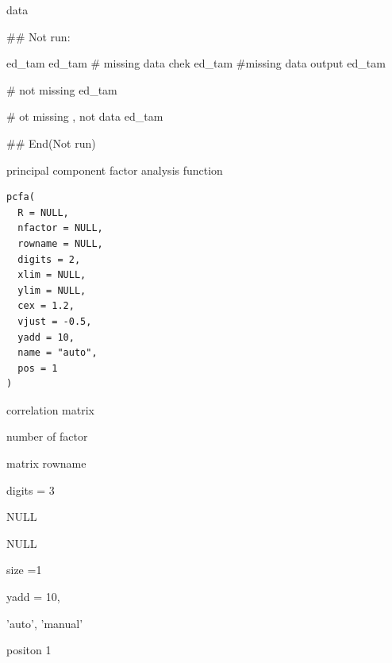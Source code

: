 \documentclass[a4paper]{book}
\begin{document}
%
\begin{Value}
data
\end{Value}
%
\begin{Examples}
\begin{ExampleCode}

## Not run: 

ed_tam %
ed_tam %
# missing data chek
ed_tam %
#missing data output
ed_tam %

# not missing
ed_tam %

# ot missing , not data
ed_tam %



## End(Not run)


\end{ExampleCode}
\end{Examples}
%
\begin{Description}
principal component factor analysis function
\end{Description}
%
\begin{Usage}
\begin{verbatim}
pcfa(
  R = NULL,
  nfactor = NULL,
  rowname = NULL,
  digits = 2,
  xlim = NULL,
  ylim = NULL,
  cex = 1.2,
  vjust = -0.5,
  yadd = 10,
  name = "auto",
  pos = 1
)
\end{verbatim}
\end{Usage}
%
\begin{Arguments}
\begin{ldescription}
\item[\code{R}] correlation matrix

\item[\code{nfactor}] number of factor

\item[\code{rowname}] matrix rowname

\item[\code{digits}] digits = 3

\item[\code{xlim}] NULL

\item[\code{ylim}] NULL

\item[\code{cex}] size =1

\item[\code{yadd}] yadd = 10,

\item[\code{name}] 'auto', 'manual'

\item[\code{pos}] positon  1
\end{ldescription}
\end{Arguments}
\end{document}

